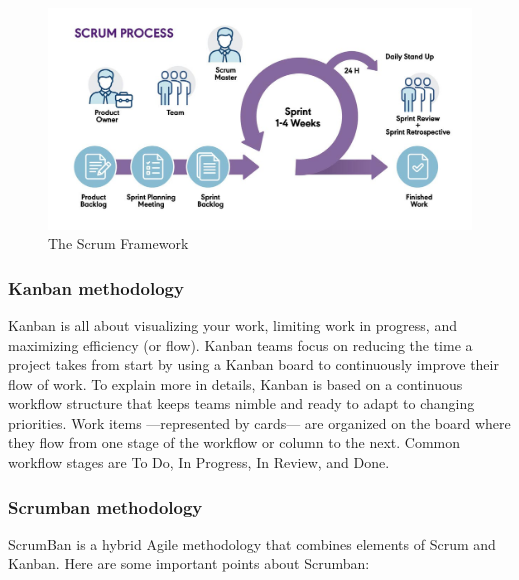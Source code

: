\begin{figure}[H]
    \centering
    \includegraphics[width=1\textwidth]{src/assets/chapters/blog-scrum-process-opt.jpg}
    \caption{The Scrum Framework}
    \label{fig:Scrum_Framework_image}
\end{figure}


\subsubsection{Kanban methodology}
Kanban is all about visualizing your work, limiting work in progress, and maximizing efficiency (or flow).
Kanban teams focus on reducing the time a project takes from start by using a Kanban board to continuously improve their flow of work.
To explain more in details, Kanban is based on a continuous workflow structure that keeps teams nimble and ready to adapt to changing priorities.
Work items —represented by cards— are organized on the board where they flow from one stage of the workflow or column to the next.
Common workflow stages are To Do, In Progress, In Review, and Done.

\subsubsection{Scrumban methodology}
ScrumBan is a hybrid Agile methodology that combines elements of Scrum and Kanban. Here are some important points about Scrumban:

